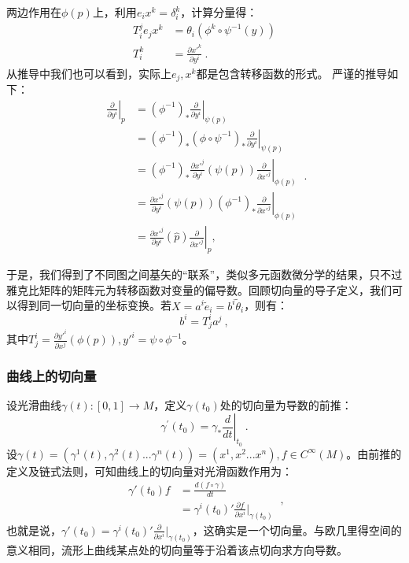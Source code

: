 两边作用在$\phi(p)$上，利用$e_ix^k=\delta^k_i$，计算分量得：
\begin{equation}
\begin{aligned}
 T^j_i e_j x^k&=\theta_i (\phi^k\circ \psi^{-1}(y))\\
T^k_i&=\frac{\partial x'^{k}}{\partial y^i}~.
\end{aligned}
\end{equation}
从推导中我们也可以看到，实际上$e_j,x^k$都是包含转移函数的形式。
严谨的推导如下：
\begin{equation}
\begin{aligned}
\left.\frac{\partial}{\partial y^i}\right|_p & =\left.\left(\phi^{-1}\right)_* \frac{\partial}{\partial y^i}\right|_{\psi(p)} \\
& =\left.\left(\phi^{-1}\right)_*\left(\phi \circ \psi^{-1}\right)_* \frac{\partial}{\partial y^i}\right|_{\psi(p)} \\
& =\left.\left(\phi^{-1}\right)_* \frac{\partial x'^j}{\partial y^i}(\psi(p)) \frac{\partial}{\partial x'^j}\right|_{\phi(p)} \\
& =\left.\frac{\partial x'^j}{\partial y^i}(\psi(p))\left(\phi^{-1}\right)_* \frac{\partial}{\partial x'^j}\right|_{\phi(p)} \\
& =\left.\frac{\partial x'^j}{\partial y^i}(\widehat{p}) \frac{\partial}{\partial x'^j}\right|_p,
\end{aligned}~.
\end{equation}

于是，我们得到了不同图之间基矢的“联系”，类似多元函数微分学的结果，只不过雅克比矩阵的矩阵元为转移函数对变量的偏导数。回顾切向量的导子定义，我们可以得到同一切向量的坐标变换。若$X=a^i\widetilde e_i=b^i\widetilde  \theta_i$，则有：
\begin{equation}
b^i=T^i_ja^j~,
\end{equation}
其中$T^i_j=\frac{\partial y'^{i}}{\partial x^j}(\phi(p)),y'^i=\psi\circ\phi^{-1}$。
\subsubsection{曲线上的切向量}
设光滑曲线$\gamma(t):[0,1]\rightarrow M$，定义$\gamma(t_0)$处的切向量为导数的前推：
\begin{equation}
\gamma^{\prime}\left(t_0\right)=\left.\gamma_* \frac{d}{d t}\right|_{t_0}~.
\end{equation}
设$\gamma(t)=(\gamma^1(t),\gamma^2(t)...\gamma^n(t))=(x^1,x^2...x^n),f\in C^{\infty}(M)$。由前推的定义及链式法则，可知曲线上的切向量对光滑函数作用为：
\begin{equation}
\begin{aligned}
\gamma'(t_0)f&=\frac{d(f\circ\gamma)}{dt}\\
&=\gamma^i(t_0)'\frac{\partial f}{\partial x^i}\bigg|_{\gamma(t_0)}
\end{aligned}~,
\end{equation}
也就是说，$\gamma'(t_0)=\gamma^i(t_0)'\frac{\partial }{\partial x^i}\bigg|_{\gamma(t_0)}$，这确实是一个切向量。与欧几里得空间的意义相同，流形上曲线某点处的切向量等于沿着该点切向求方向导数。

